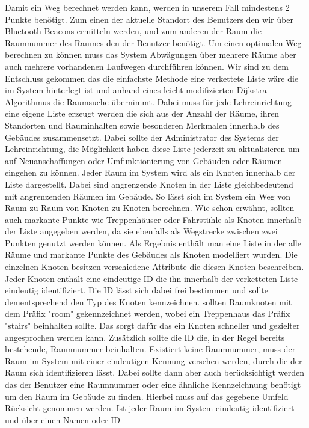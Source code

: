 Damit ein Weg berechnet werden kann, werden in unserem Fall mindestens 2 Punkte
benötigt. Zum einen der aktuelle Standort des Benutzers den wir über Bluetooth
Beacons ermitteln werden, und zum anderen der Raum \bspw die Raumnummer des
Raumes den der Benutzer benötigt. Um einen optimalen Weg berechnen zu können
muss das System Abwägungen über mehrere Räume aber auch mehrere vorhandenen
Laufwegen durchführen können.
Wir sind zu dem Entschluss gekommen das die einfachste Methode eine verkettete
Liste wäre die im System hinterlegt ist und anhand eines leicht modifizierten
Dijkstra-Algorithmus die Raumsuche übernimmt. Dabei muss für jede
Lehreinrichtung eine eigene Liste erzeugt werden die sich aus der Anzahl der
Räume, ihren Standorten und Rauminhalten sowie besonderen Merkmalen innerhalb
des Gebäudes zusammensetzt. Dabei sollte \zB der Administrator des Systems der
Lehreinrichtung, die Möglichkeit haben diese Liste jederzeit zu aktualisieren
um auf \zB Neuanschaffungen oder Umfunktionierung von Gebäuden oder Räumen
eingehen zu können.
Jeder Raum im System wird als ein Knoten innerhalb der Liste dargestellt.
Dabei sind angrenzende Knoten in der Liste gleichbedeutend mit angrenzenden
Räumen im Gebäude. So lässt sich im System ein Weg von Raum zu Raum \bzw von
Knoten zu Knoten berechnen. Wie schon erwähnt, sollten auch markante Punkte wie
Treppenhäuser oder Fahrstühle als Knoten innerhalb der Liste angegeben werden,
da sie ebenfalls als Wegstrecke zwischen zwei Punkten genutzt werden können.
Als Ergebnis enthält man eine Liste in der alle Räume und markante Punkte des
Gebäudes als Knoten modelliert wurden. Die einzelnen Knoten besitzen
verschiedene Attribute die diesen Knoten beschreiben. Jeder Knoten enthält
eine eindeutige ID die ihn innerhalb der verketteten Liste eindeutig
identifiziert. Die ID lässt sich dabei frei bestimmen und sollte
dementsprechend den Typ des Knoten kennzeichnen. \Bspw sollten Raumknoten mit
dem Präfix "room" gekennzeichnet werden, wobei ein Treppenhaus das Präfix
"stairs" beinhalten sollte. Das sorgt dafür das ein Knoten schneller und
gezielter angesprochen werden kann. Zusätzlich sollte die ID die, in der Regel
bereits bestehende, Raumnummer beinhalten. Existiert keine Raumnummer, muss der
Raum im System mit einer eindeutigen Kennung versehen werden, durch die der
Raum sich identifizieren lässt. Dabei sollte dann aber auch berücksichtigt
werden das der Benutzer eine Raumnummer oder eine ähnliche Kennzeichnung
benötigt um den Raum im Gebäude zu finden. Hierbei muss auf das gegebene Umfeld
Rücksicht genommen werden.
Ist jeder Raum im System eindeutig identifiziert und über einen Namen oder ID
